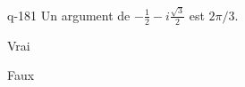 \begin{truefalse}{q-181}
Un argument de $-\frac{1}{2}-i\frac{\sqrt 3}{2}$ est $2\pi/3$.
\item Vrai
\item* Faux
\end{truefalse}


